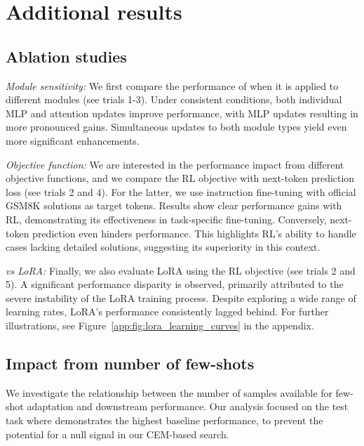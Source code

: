 \section{Additional results}
\label{app:sec:additional_exp}


\subsection{Ablation studies}
\label{app:sec:ablation_studies}

\textit{Module sensitivity:} We first compare the performance of \svdacro when it is applied to different modules (see trials 1-3).
Under consistent conditions, both individual MLP and attention updates improve performance, with MLP updates resulting in more pronounced gains.
Simultaneous updates to both module types yield even more significant enhancements.

\textit{Objective function:} We are interested in the performance impact from different objective functions, and we compare the RL objective with next-token prediction loss (see trials 2 and 4).
For the latter, we use instruction fine-tuning with official GSM8K solutions as target tokens.
Results show clear performance gains with RL, demonstrating its effectiveness in task-specific fine-tuning.
Conversely, next-token prediction even hinders performance.
This highlights RL's ability to handle cases lacking detailed solutions, suggesting its superiority in this context.

\textit{\svdacro vs LoRA:} Finally, we also evaluate LoRA using the RL objective (see trials 2 and 5).
A significant performance disparity is observed, primarily attributed to the severe instability of the LoRA training process.
Despite exploring a wide range of learning rates, LoRA's performance consistently lagged behind.
For further illustrations, see Figure~\ref{app:fig:lora_learning_curves} in the appendix.



\subsection{Impact from number of few-shots}
\label{app:sec:ablation_few_shots}

We investigate the relationship between the number of samples available for few-shot adaptation and downstream performance.
Our analysis focused on the test task where \llama demonstrates the highest baseline performance, to prevent the potential for a null signal in our CEM-based search.


